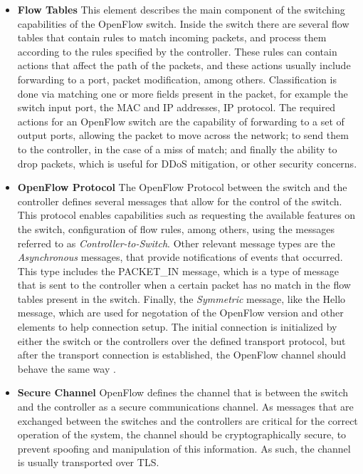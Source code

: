 \begin {enumerate}
\begin {itemize}
    \item \textbf {Flow Tables} This element describes the main component of the switching capabilities of the OpenFlow switch. Inside the switch there are several
        flow tables that contain rules to match incoming packets, and process them according to the rules specified by the controller. These rules can
        contain actions that affect the path of the packets, and these actions usually include forwarding to a port, packet modification, among others.
        Classification is done via matching one or more fields present in the packet, for example the switch input port, the MAC and IP addresses, IP protocol.
        The required actions for an OpenFlow switch are the capability of forwarding to a set of output ports, allowing the packet to move across the network;
        to send them to the controller, in the case of a miss of match; and finally the ability to drop packets, which is useful for DDoS mitigation, or other
        security concerns.
    \item \textbf {OpenFlow Protocol} The OpenFlow Protocol between the switch and the controller defines several messages that allow for the control of the switch.
        This protocol enables capabilities such as requesting the available features on the switch, configuration of flow rules, among others, using the 
        messages referred to as \textit {Controller-to-Switch}. Other relevant message types are the \textit {Asynchronous} messages, that provide notifications of
        events that occurred. This type includes the PACKET\_IN message, which is a type of message that is sent to the controller when a certain packet has no match
        in the flow tables present in the switch. Finally, the \textit{Symmetric} message, like the Hello message, which are used for negotation of the OpenFlow
        version and other elements to help connection setup. The initial connection is initialized by either the switch or the controllers over the defined
        transport protocol, but after the transport connection is established, the OpenFlow channel should behave the same way 
        \cite{open_networking_foundation_openflow_2015}.
    \item \textbf {Secure Channel} OpenFlow defines the channel that is between the switch and the controller as a secure communications channel. As messages 
        that are exchanged between the switches and the controllers are critical for the correct operation of the system, the channel should be cryptographically
        secure, to prevent spoofing and manipulation of this information. As such, the channel is usually transported over TLS.
\end {itemize}


\end{enumerate}
